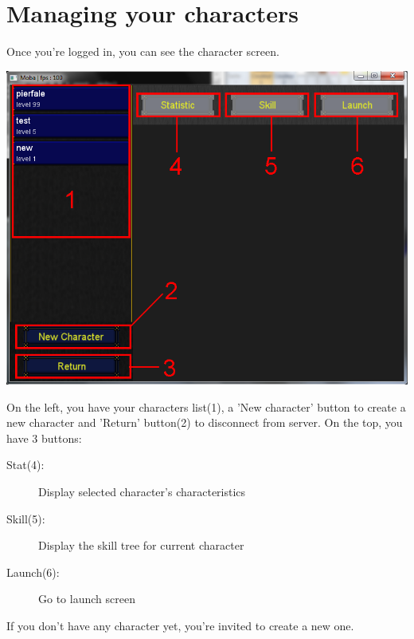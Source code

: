 \documentclass{scrreprt}
\begin{document}
			  \section{Managing your characters}
			  Once you're logged in, you can see the character screen.
			  \begin{center}
			  \includegraphics[scale=0.4]{character_screen.png}
			  \end{center}
			  On the left, you have your characters list(1), a 'New character' button to create a new character and 'Return' button(2) to disconnect from server. On the top, you have 3 buttons:
			  \begin{description}
			  \item[Stat(4):]{Display selected character's characteristics}
			  \item[Skill(5):]{Display the skill tree for current character}
			  \item[Launch(6):]{Go to launch screen}
			  \end{description}
			  If you don't have any character yet, you're invited to create a new one.
\end{document}
